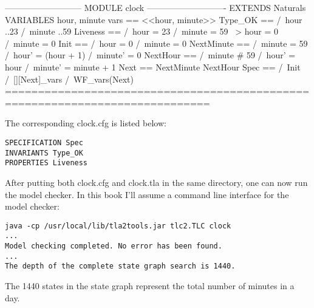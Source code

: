 \begin{tla}
--------------------------- MODULE clock ----------------------------
EXTENDS Naturals
VARIABLES hour, minute
vars == <<hour, minute>>
Type_OK == 
    /\ hour ..23
    /\ minute ..59
Liveness ==
    /\ hour = 23 /\ minute = 59 ~> hour = 0 /\ minute = 0
Init ==
    /\ hour = 0
    /\ minute = 0
NextMinute ==
    /\ minute = 59 
    /\ hour' = (hour + 1) %
    /\ minute' = 0
NextHour == 
    /\ minute # 59
    /\ hour' = hour 
    /\ minute' = minute + 1 
Next ==
    \/ NextMinute
    \/ NextHour
Spec ==
  /\ Init
  /\ [][Next]_vars
  /\ WF_vars(Next)
=============================================================================
\end{tla}
\begin{tlatex}
\@x{}\moduleLeftDash{}\moduleRightDash\@xx{}%
%
%
%
%
%
%
%
%
%
%
%
%
%
%
%
%
%
%
%
%
%
%
%
%
%
\@x{}\bottombar\@xx{}%
\end{tlatex}

The corresponding clock.cfg is listed below: 
\begin{framed}
\begin{verbatim}
SPECIFICATION Spec
INVARIANTS Type_OK
PROPERTIES Liveness
\end{verbatim}
\end{framed}

After putting both clock.cfg and clock.tla in the same directory, one can now
run the model checker. In this book I'll assume a command line interface for the
model checker:
\begin{verbatim}
java -cp /usr/local/lib/tla2tools.jar tlc2.TLC clock
...
Model checking completed. No error has been found.
...
The depth of the complete state graph search is 1440.
\end{verbatim}
The 1440 states in the state graph represent the total number of minutes in a day.
